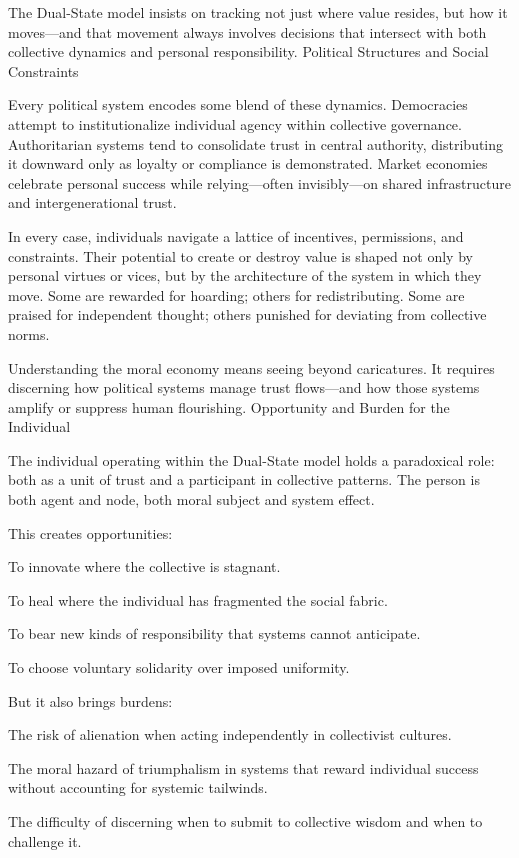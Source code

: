 \documentclass[11pt,oneside]{book}
\begin{document}
The Dual-State model insists on tracking not just where value resides, but how it moves—and that movement always involves decisions that intersect with both collective dynamics and personal responsibility.
Political Structures and Social Constraints

Every political system encodes some blend of these dynamics. Democracies attempt to institutionalize individual agency within collective governance. Authoritarian systems tend to consolidate trust in central authority, distributing it downward only as loyalty or compliance is demonstrated. Market economies celebrate personal success while relying—often invisibly—on shared infrastructure and intergenerational trust.

In every case, individuals navigate a lattice of incentives, permissions, and constraints. Their potential to create or destroy value is shaped not only by personal virtues or vices, but by the architecture of the system in which they move. Some are rewarded for hoarding; others for redistributing. Some are praised for independent thought; others punished for deviating from collective norms.

Understanding the moral economy means seeing beyond caricatures. It requires discerning how political systems manage trust flows—and how those systems amplify or suppress human flourishing.
Opportunity and Burden for the Individual

The individual operating within the Dual-State model holds a paradoxical role: both as a unit of trust and a participant in collective patterns. The person is both agent and node, both moral subject and system effect.

This creates opportunities:

    To innovate where the collective is stagnant.

    To heal where the individual has fragmented the social fabric.

    To bear new kinds of responsibility that systems cannot anticipate.

    To choose voluntary solidarity over imposed uniformity.

But it also brings burdens:

    The risk of alienation when acting independently in collectivist cultures.

    The moral hazard of triumphalism in systems that reward individual success without accounting for systemic tailwinds.

    The difficulty of discerning when to submit to collective wisdom and when to challenge it.
\end{document}
